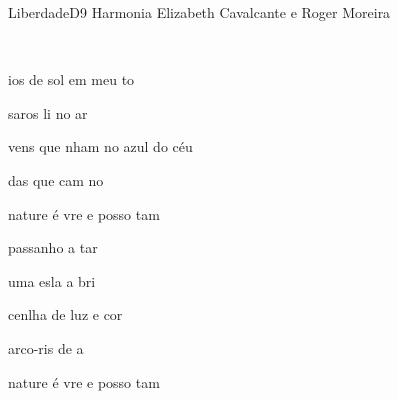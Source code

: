 \documentclass[a4,12pt,oneside]{book}
\newcommand{\RevDate}{\today}
\newcommand{\NotCCLIed}{\relax}
\begin{document}
\begin{song}{Liberdade}{D9}
  {Harmonia}
  {Elizabeth Cavalcante e Roger Moreira}
  {}
  {\NotCCLIed}
  
	\renewcommand{\RevDate}{25 de setembro de 2014}
  
	
	\ifChordBk
		{\vspace{-2em}\flushright{\Dnonachord \quad \Cchord \quad \Anonachord 
		    \quad \Bbchord \quad \Amchord \quad \DCchord
		    
		    ~\\
		    
		    \Gchord \quad \Fmchord \quad \Emchord \quad \Bbsaumchord \quad \Gsaumchord
		    
		    ~\\
		    
		    \Bbsaumchord \quad \Csaumchord
		    
		    ~\\
		    
		    \Gmchord}\\}
		\vspace{-5.5cm}
	\fi
		
	\begin{SBVerse}
		ios de sol em meu to 
		
		saros li no ar 
		
		vens que nham no azul do céu
		
		das que cam no  
	\end{SBVerse}
	
	\begin{SBChorus*}
		 nature é vre e  posso  tam \Ch{A9}{}
	\end{SBChorus*}
	
	
	\begin{SBVerse}
		 passanho a tar \Ch{A9}{}
		
		 uma esla a bri \Ch{A9}{}
		
		 cenlha de luz e cor \Ch{A9}{}
		
		 arco-ris de a \Ch{A9}{}
	\end{SBVerse}
	
	\begin{SBChorus*}
		 nature é vre e  posso  tam 
	\end{SBChorus*}
	

\end{song}
\end{document}
